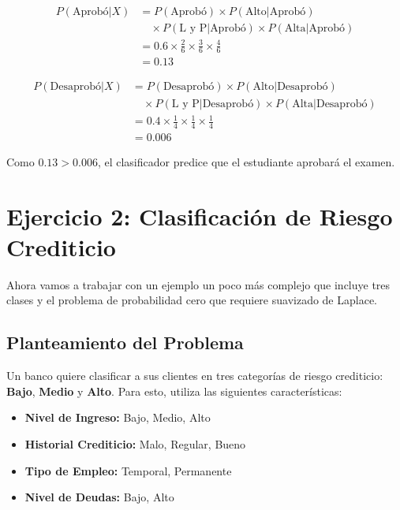 \documentclass[12pt]{article}
\begin{document}
\begin{align*}
P(\text{Aprobó}|X) &= P(\text{Aprobó}) \times P(\text{Alto}|\text{Aprobó}) \\
&\quad \times P(\text{L y P}|\text{Aprobó}) \times P(\text{Alta}|\text{Aprobó}) \\
&= 0.6 \times \frac{2}{6} \times \frac{3}{6} \times \frac{4}{6} \\
&= 0.13
\end{align*}

\begin{align*}
P(\text{Desaprobó}|X) &= P(\text{Desaprobó}) \times P(\text{Alto}|\text{Desaprobó}) \\
&\quad \times P(\text{L y P}|\text{Desaprobó}) \times P(\text{Alta}|\text{Desaprobó}) \\
&= 0.4 \times \frac{1}{4} \times \frac{1}{4} \times \frac{1}{4} \\
&= 0.006
\end{align*}

Como $0.13 > 0.006$, el clasificador predice que el estudiante aprobará el examen.

\section{Ejercicio 2: Clasificación de Riesgo Crediticio}
Ahora vamos a trabajar con un ejemplo un poco más complejo que incluye tres clases y el problema de probabilidad cero que requiere suavizado de Laplace.

\subsection{Planteamiento del Problema}
Un banco quiere clasificar a sus clientes en tres categorías de riesgo crediticio: \textbf{Bajo}, \textbf{Medio} y \textbf{Alto}. Para esto, utiliza las siguientes características:

\begin{itemize}
    \item \textbf{Nivel de Ingreso:} Bajo, Medio, Alto
    \item \textbf{Historial Crediticio:} Malo, Regular, Bueno
    \item \textbf{Tipo de Empleo:} Temporal, Permanente
    \item \textbf{Nivel de Deudas:} Bajo, Alto
\end{itemize}
\end{document}
